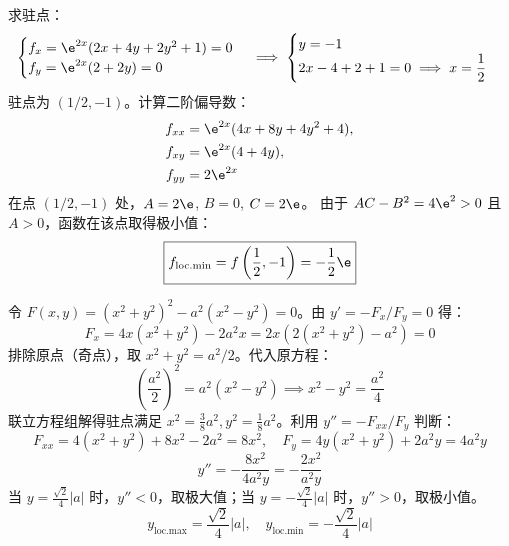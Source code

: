 \begin{solution}
    求驻点：
    \begin{equation}
        \begin{cases}
            f_x = \e^{2x}(2x + 4y + 2y^2 + 1) = 0 \\
            f_y = \e^{2x}(2 + 2y) = 0
        \end{cases} \implies
        \begin{cases}
            y = -1 \\
            2x - 4 + 2 + 1 = 0 \implies x = \dfrac{1}{2}
        \end{cases}
    \end{equation}
    驻点为 $(1/2, -1)$。计算二阶偏导数：
    \begin{equation}
        \begin{aligned}
            f_{xx} & = \e^{2x}(4x + 8y + 4y^2 + 4), \\
            f_{xy} & = \e^{2x}(4 + 4y),             \\
            f_{yy} & = 2\e^{2x}
        \end{aligned}
    \end{equation}
    在点 $(1/2, -1)$ 处，$A = 2\e$, $B = 0$, $C = 2\e$。
    由于 $AC - B^2 = 4\e^2 > 0$ 且 $A > 0$，函数在该点取得极小值：
    \begin{equation}
        \boxed{f_{\text{loc.min}} = f\left(\frac{1}{2}, -1\right) = -\frac{1}{2}\e}
    \end{equation}

    令 $F(x, y) = (x^2 + y^2)^2 - a^2(x^2 - y^2) = 0$。由 $y' = -F_x / F_y = 0$ 得：
    \begin{equation}
        F_x = 4x(x^2 + y^2) - 2a^2x = 2x(2(x^2 + y^2) - a^2) = 0
    \end{equation}
    排除原点（奇点），取 $x^2 + y^2 = a^2/2$。代入原方程：
    \begin{equation}
        \left(\frac{a^2}{2}\right)^2 = a^2(x^2 - y^2) \implies x^2 - y^2 = \frac{a^2}{4}
    \end{equation}
    联立方程组解得驻点满足 $x^2 = \frac{3}{8}a^2, y^2 = \frac{1}{8}a^2$。利用 $y'' = -F_{xx} / F_y$ 判断：
    \begin{equation}
        F_{xx} = 4(x^2 + y^2) + 8x^2 - 2a^2 = 8x^2, \quad F_y = 4y(x^2 + y^2) + 2a^2y = 4a^2y
    \end{equation}
    \begin{equation}
        y'' = -\frac{8x^2}{4a^2y} = -\frac{2x^2}{a^2y}
    \end{equation}
    当 $y = \frac{\sqrt{2}}{4}|a|$ 时，$y'' < 0$，取极大值；当 $y = -\frac{\sqrt{2}}{4}|a|$ 时，$y'' > 0$，取极小值。
    \begin{equation}
        \boxed{y_{\text{loc.max}} = \frac{\sqrt{2}}{4}|a|, \quad y_{\text{loc.min}} = -\frac{\sqrt{2}}{4}|a|}
    \end{equation}


\end{solution}
